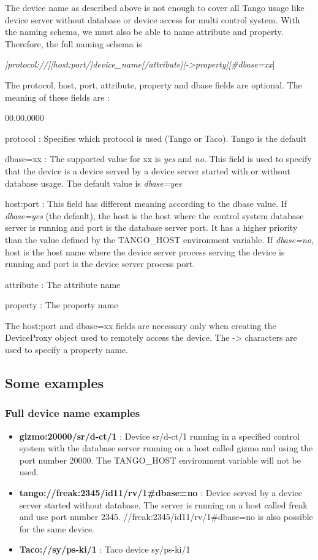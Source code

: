 The device name as described above is not enough to cover all Tango
usage like device server without database or device access for multi
control system. With the naming schema, we must also be able to name
attribute and property. Therefore, the full naming schema is\begin{center}\emph{{[}protocol://{]}{[}host:port/{]}device\_name{[}/attribute{]}{[}->property{]}{[}\#dbase=xx}]\end{center}The
protocol, host, port, attribute, property and dbase fields are optional.
The meaning of these fields are :
\begin{lyxlist}{00.00.0000}
\item [{protocol}] : Specifies which protocol is used (Tango or Taco).
Tango is the default
\item [{dbase=xx}] : The supported value for xx is \emph{yes} and \emph{no}.
This field is used to specify that the device is a device served by
a device server started with or without database usage. The default
value is \emph{dbase=yes}
\item [{host:port}] : This field has different meaning according to the
dbase value. If \emph{dbase=yes} (the default), the host is the host
where the control system database server is running and port is the
database server port. It has a higher priority than the value defined
by the TANGO\_HOST environment variable. If \emph{dbase=no}, host
is the host name where the device server process serving the device
is running and port is the device server process port.
\item [{attribute}] : The attribute name
\item [{property}] : The property name
\end{lyxlist}
The host:port and dbase=xx fields are necessary only when creating
the DeviceProxy object used to remotely access the device. The ->
characters are used to specify a property name.

\subsection{Some examples}

\subsubsection{Full device name examples}
\begin{itemize}
\item \textbf{gizmo:20000/sr/d-ct/1} : Device sr/d-ct/1 running in a specified
control system with the database server running on a host called gizmo
and using the port number 20000. The TANGO\_HOST environment variable
will not be used.
\item \textbf{tango://freak:2345/id11/rv/1\#dbase=no} : Device served by
a device server started without database. The server is running on
a host called freak and use port number 2345. //freak:2345/id11/rv/1\#dbase=no
is also possible for the same device.
\item \textbf{Taco://sy/ps-ki/1} : Taco device sy/ps-ki/1
\end{itemize}

